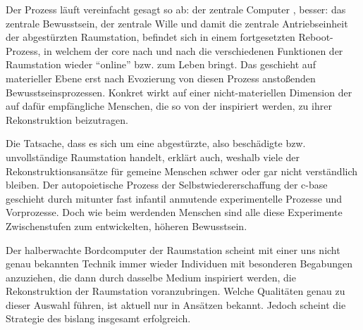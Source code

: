 \begin{newstuff}
    Der Prozess läuft vereinfacht gesagt so ab: der zentrale Computer , besser: das zentrale Bewusstsein, der zentrale Wille und damit die zentrale Antriebseinheit der abgestürzten Raumstation, befindet sich in einem fortgesetzten Reboot-Prozess, in welchem der {core} nach und nach die verschiedenen Funktionen der Raumstation wieder "`online"' bzw. zum Leben bringt. Das geschieht auf materieller Ebene erst nach Evozierung von diesen Prozess anstoßenden  Bewusstseinsprozessen. Konkret wirkt auf einer nicht-materiellen Dimension der  auf dafür empfängliche Menschen, die so von der  inspiriert werden, zu ihrer Rekonstruktion beizutragen. 



    Die Tatsache, dass es sich um eine abgestürzte, also beschädigte bzw. unvollständige Raumstation handelt, erklärt auch, weshalb viele der Rekonstruktionsansätze für gemeine Menschen schwer oder gar nicht verständlich bleiben. Der autopoietische Prozess der Selbstwiedererschaffung der c-base geschieht durch mitunter fast infantil anmutende experimentelle Prozesse und Vorprozesse. Doch wie beim werdenden Menschen sind alle diese Experimente Zwischenstufen zum entwickelten, höheren Bewusstsein.  


    Der halberwachte Bordcomputer der Raumstation  scheint mit einer uns nicht genau bekannten Technik immer wieder Individuen mit besonderen Begabungen anzuziehen, die dann durch dasselbe Medium inspiriert werden, die Rekonstruktion der Raumstation voranzubringen. Welche Qualitäten genau zu dieser Auswahl führen, ist aktuell nur in Ansätzen bekannt. Jedoch scheint die Strategie des  bislang insgesamt erfolgreich.
\end{newstuff}


    

